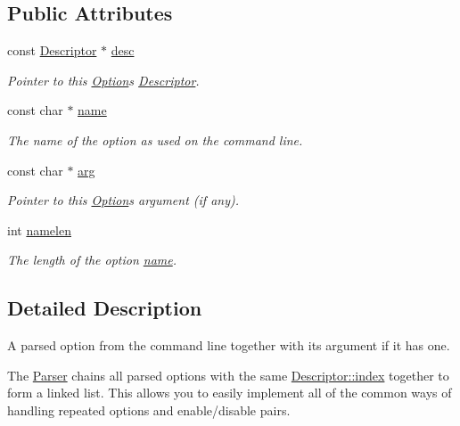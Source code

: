 \subsection*{Public Attributes}
\begin{DoxyCompactItemize}
\item 
const \hyperlink{structoption_1_1Descriptor}{Descriptor} $\ast$ \hyperlink{classoption_1_1Option_af8d664a7b5de1425008b1812a90a0c23}{desc}
\begin{DoxyCompactList}\small\item\em Pointer to this \hyperlink{classoption_1_1Option}{Option}\textquotesingle{}s \hyperlink{structoption_1_1Descriptor}{Descriptor}. \end{DoxyCompactList}\item 
const char $\ast$ \hyperlink{classoption_1_1Option_a02a76b4896abd22d0ba8514362261de9}{name}
\begin{DoxyCompactList}\small\item\em The name of the option as used on the command line. \end{DoxyCompactList}\item 
const char $\ast$ \hyperlink{classoption_1_1Option_a402be734987458364b0f473acae36238}{arg}
\begin{DoxyCompactList}\small\item\em Pointer to this \hyperlink{classoption_1_1Option}{Option}\textquotesingle{}s argument (if any). \end{DoxyCompactList}\item 
int \hyperlink{classoption_1_1Option_a3aa2957b19ad5815873441b415d56050}{namelen}
\begin{DoxyCompactList}\small\item\em The length of the option \hyperlink{classoption_1_1Option_a02a76b4896abd22d0ba8514362261de9}{name}. \end{DoxyCompactList}\end{DoxyCompactItemize}


\subsection{Detailed Description}
A parsed option from the command line together with its argument if it has one. 

The \hyperlink{classoption_1_1Parser}{Parser} chains all parsed options with the same \hyperlink{structoption_1_1Descriptor_a1fee8ac44f529c99ac2b1149b4c391b1}{Descriptor\+::index} together to form a linked list. This allows you to easily implement all of the common ways of handling repeated options and enable/disable pairs.

